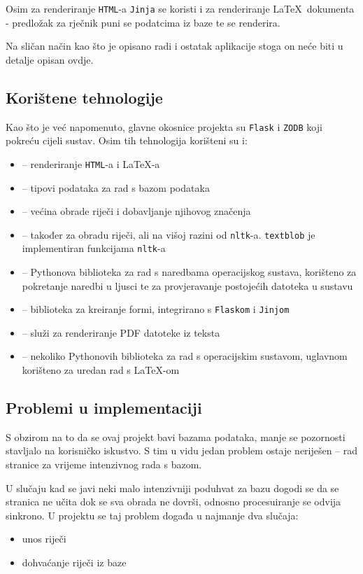 \documentclass{foi}
\begin{document}
Osim za renderiranje \texttt{HTML}-a \texttt{Jinja} se koristi i za
renderiranje \LaTeX\ dokumenta - predložak za rječnik puni se podatcima iz baze
te se renderira.

Na sličan način kao što je opisano radi i ostatak aplikacije stoga on neće biti
u detalje opisan ovdje.

\subsection{Korištene tehnologije}

Kao što je već napomenuto, glavne okosnice projekta su \texttt{Flask} i
\texttt{ZODB} koji pokreću cijeli sustav. Osim tih tehnologija korišteni su i:
\begin{itemize}
	\item[\texttt{Jinja}] -- renderiranje \texttt{HTML}-a i \LaTeX-a
	\item[\texttt{persistent}] -- tipovi podataka za rad s bazom podataka
	\item[\texttt{nltk}] -- većina obrade riječi i dobavljanje njihovog
		značenja
	\item[\texttt{textblob}] -- također za obradu riječi, ali na višoj
		razini od \texttt{nltk}-a. \texttt{textblob} je implementiran
		funkcijama \texttt{nltk}-a
	\item[\texttt{os}] -- Pythonova biblioteka za rad s naredbama
		operacijskog sustava, korišteno za pokretanje naredbi u ljusci
		te za provjeravanje postojećih datoteka u sustavu
	\item[\texttt{wtforms}] -- biblioteka za kreiranje formi, integrirano s
		\texttt{Flaskom} i \texttt{Jinjom}
	\item[\LaTeX] -- služi za renderiranje PDF datoteke iz teksta
	\item[ostalo] -- nekoliko Pythonovih biblioteka za rad s operacijskim
		sustavom, uglavnom korišteno za uredan rad s \LaTeX-om
\end{itemize}

\subsection{Problemi u implementaciji}

S obzirom na to da se ovaj projekt bavi bazama podataka, manje se pozornosti
stavljalo na korisničko iskustvo. S tim u vidu jedan problem ostaje neriješen
-- rad stranice za vrijeme intenzivnog rada s bazom.

U slučaju kad se javi neki malo intenzivniji poduhvat za bazu dogodi se da se
stranica ne učita dok se sva obrada ne dovrši, odnosno procesuiranje se odvija
sinkrono. U projektu se taj problem događa u najmanje dva slučaja:
\begin{itemize}
	\item unos riječi
	\item dohvaćanje riječi iz baze
\end{itemize}
\end{document}
